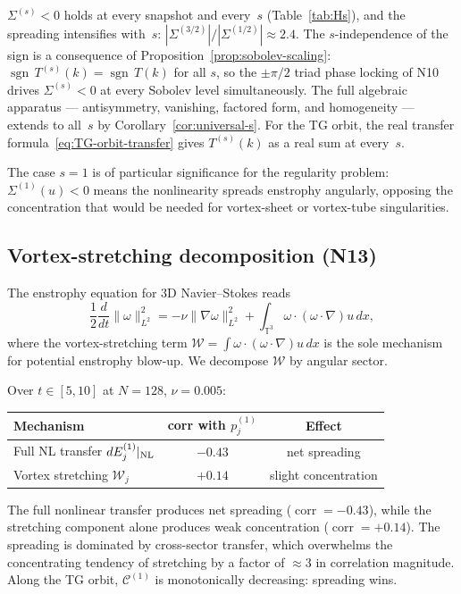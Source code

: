\documentclass[11pt]{article}
\theoremstyle{definition}
\newcommand{\T}{\mathbb{T}}
\newcommand{\cC}{\mathcal{C}}
\DeclareMathOperator{\corr}{corr}
\DeclareMathOperator{\sgn}{sgn}
\begin{document}
$\Sigma^{(s)}<0$ holds at every snapshot and every~$s$
(Table~\ref{tab:Hs}), and the spreading intensifies
with~$s$: $|\Sigma^{(3/2)}|/|\Sigma^{(1/2)}|\approx 2.4$.
The $s$-independence of the sign is a consequence of
Proposition~\ref{prop:sobolev-scaling}:
$\sgn\, T^{(s)}(k) = \sgn\, T(k)$ for all $s$, so the
$\pm\pi/2$ triad phase locking of N10 drives
$\Sigma^{(s)}<0$ at every Sobolev level simultaneously.
The full algebraic apparatus ---
antisymmetry, vanishing, factored form, and
homogeneity --- extends to all~$s$ by
Corollary~\ref{cor:universal-s}.
For the TG orbit, the real transfer
formula~\eqref{eq:TG-orbit-transfer}
gives $T^{(s)}(k)$ as a real sum at every~$s$.

The case $s=1$ is of particular significance for the
regularity problem: $\Sigma^{(1)}(u) < 0$ means the
nonlinearity spreads enstrophy angularly, opposing the
concentration that would be needed for vortex-sheet or
vortex-tube singularities.


\subsection{Vortex-stretching decomposition (N13)}
\label{sec:stretching}

The enstrophy equation for 3D Navier--Stokes reads
\begin{equation}\label{eq:enstrophy}
\frac{1}{2}\frac{d}{dt}\|\omega\|_{L^2}^2
= -\nu\|\nabla\omega\|_{L^2}^2
+ \int_{\T^3}\omega\cdot(\omega\cdot\nabla)u\,dx,
\end{equation}
where the vortex-stretching term
$\mathcal{W}=\int\omega\cdot(\omega\cdot\nabla)u\,dx$
is the sole mechanism for potential enstrophy blow-up.
We decompose $\mathcal{W}$ by angular sector.

Over $t\in[5,10]$ at $N=128$, $\nu=0.005$:
\begin{center}
\renewcommand{\arraystretch}{1.2}
\begin{tabular}{@{}lcc@{}}
\toprule
\textbf{Mechanism} & \textbf{corr with $p_j^{(1)}$}
  & \textbf{Effect} \\
\midrule
Full NL transfer $dE_j^{(1)}|_{\rm NL}$
  & $-0.43$ & net spreading \\
Vortex stretching $\mathcal{W}_j$
  & $+0.14$ & slight concentration \\
\bottomrule
\end{tabular}
\end{center}

The full nonlinear transfer produces net spreading
($\corr=-0.43$), while the stretching component alone
produces weak concentration ($\corr=+0.14$).  The
spreading is dominated by cross-sector transfer, which
overwhelms the concentrating tendency of stretching by
a factor of $\approx 3$ in correlation magnitude.
Along the TG orbit, $\cC^{(1)}$ is monotonically
decreasing: spreading wins.
\end{document}
